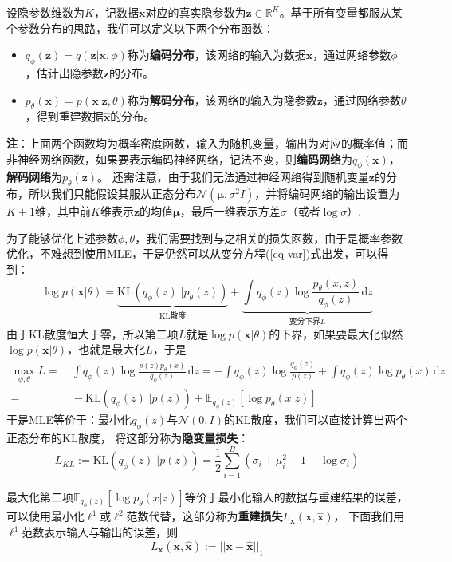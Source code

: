 \documentclass[12pt, a4paper, oneside]{ctexart}
\def\bd{\boldsymbol}        %
\def\R{\mathbb{R}}          %
\def\E{\mathbb{E}}          %
\def\d{\mathrm{d}}          %
\begin{document}
设隐参数维数为$K$，记数据$\bd{x}$对应的真实隐参数为$\bd{z}\in\R^K$。基于所有变量都服从某个参数分布的思路，我们可以定义以下两个分布函数：
\begin{itemize}
    \item $q_\phi(\bd{z}) = q(\bd{z}|\bd{x},\phi)$称为\textbf{编码分布}，该网络的输入为数据$\bd{x}$，通过网络参数$\phi$，估计出隐参数$\bd{z}$的分布。
    \item $p_\theta(\bd{x}) = p(\bd{x}|\bd{z},\theta)$称为\textbf{解码分布}，该网络的输入为隐参数$\bd{z}$，通过网络参数$\theta$，得到重建数据$\hat{\bd{x}}$的分布。
\end{itemize}
\textbf{注}：上面两个函数均为概率密度函数，输入为随机变量，输出为对应的概率值；而非神经网络函数，如果要表示编码神经网络，记法不变，则\textbf{编码网络}为$q_{\phi}(\bd{x})$，\textbf{解码网络}为$p_{\theta}(\bd{z})$。
还需注意，由于我们无法通过神经网络得到随机变量$\bd{z}$的分布，所以我们只能假设其服从正态分布$\mathcal{N}(\bd{\mu},\sigma^2I)$，并将编码网络的输出设置为$K+1$维，其中前$K$维表示$\bd{z}$的均值$\bd{\mu}$，最后一维表示方差$\sigma$（或者$\log \sigma$）.

为了能够优化上述参数$\phi,\theta$，我们需要找到与之相关的损失函数，由于是概率参数优化，不难想到使用MLE，于是仍然可以从变分方程(\ref{eq-var})式出发，可以得到：
\begin{equation*}
    \log p(\bd{x}|\theta) = \underbrace{\text{KL}(q_{\phi}(z)||p_\theta(z))}_{\text{KL散度}} + \underbrace{\int q_\phi(z)\log\frac{p_\theta(x,z)}{q_\phi(z)}\,\d z}_{\text{变分下界}L}
\end{equation*}
由于KL散度恒大于零，所以第二项$L$就是$\log p(\bd{x}|\theta)$的下界，如果要最大化似然$\log p(\bd{x}|\theta)$，也就是最大化$L$，于是
\begin{align*}
    \max_{\phi,\theta}L =&\ \int q_\phi(z)\log\frac{p(z)p_\theta(x)}{q_\phi(z)}\,\d z = -\int q_\phi(z)\log\frac{q_\phi(z)}{p(z)}+\int q_\phi(z)\log p_\theta(x)\,\d z\\
    =&\ -\text{KL}(q_{\phi}(z)||p(z)) + \E_{q_{\phi}(z)}\left[\log p_{\theta}(x|z)\right]
\end{align*}
于是MLE等价于：最小化$q_\phi(z)$与$\mathcal{N}(0,I)$的KL散度，我们可以直接计算出两个正态分布的KL散度，
将这部分称为\textbf{隐变量损失}：
\begin{equation*}
    L_{KL}:= \text{KL}(q_{\phi}(z)||p(z)) = \frac{1}{2}\sum_{i=1}^B(\sigma_i + \mu_i^2-1-\log\sigma_i)
\end{equation*}

最大化第二项$\E_{q_{\phi}(z)}\left[\log p_{\theta}(x|z)\right]$等价于最小化输入的数据与重建结果的误差，
可以使用最小化$\ell^1$或$\ell^2$范数代替，这部分称为\textbf{重建损失}$L_{\bd{x}}(\bd{x},\hat{\bd{x}})$，
下面我们用$\ell^1$范数表示输入与输出的误差，则
\begin{equation*}
    L_{\bd{x}}(\bd{x},\hat{\bd{x}}) := ||\bd{x}-\hat{\bd{x}}||_1
\end{equation*}
\end{document}
